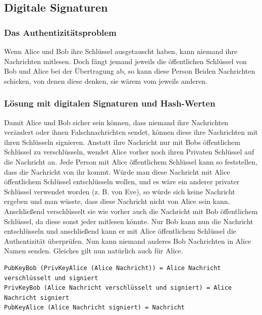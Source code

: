 \clearpage

\subsection{Digitale Signaturen}

\subsubsection{Das Authentizitätsproblem}

Wenn Alice und Bob ihre Schlüssel ausgetauscht haben, kann niemand ihre Nachrichten mitlesen.
Doch fängt jemand jeweils die öffentlichen Schlüssel von Bob und Alice bei der Übertragung ab,
so kann diese Person Beiden Nachrichten schicken, von denen diese denken, sie wärem vom
jeweils anderen.

\subsubsection{Lösung mit digitalen Signaturen und Hash-Werten}

Damit Alice und Bob sicher sein können, dass niemand ihre Nachrichten verändert oder
ihnen Falschnachrichten sendet, können diese ihre Nachrichten mit ihren Schlüsseln signieren.
Anstatt ihre Nachricht nur mit Bobs öffentlichem Schlüssel zu verschlüsseln, wendet Alice vorher noch
ihren Privaten Schlüssel auf die Nachricht an. Jede Person mit Alice öffentlichem Schlüssel
kann so feststellen, dass die Nachricht von ihr kommt. Würde man diese Nachricht mit Alice
öffentlichem Schlüssel entschlüsseln wollen, und es wäre ein anderer privater Schlüssel
verwendet worden (z. B. von Eve), so würde sich keine Nachricht ergeben und man wüsste,
dass diese Nachricht nicht von Alice sein kann. Anschließend verschlüsselt sie wie vorher
auch die Nachricht mit Bob öffentlichem Schlüssel, da diese sonst jeder mitlesen könnte.
Nur Bob kann nun die Nachricht entschlüsseln und anschließend kann er mit Alice öffentlichem
Schlüssel die Authentizität überprüfen. Nun kann niemand anderes Bob Nachrichten in Alice Namen
senden. Gleiches gilt nun natürlich auch für Alice.

\begin{lstlisting}[basicstyle=\small]
PubKeyBob (PrivKeyAlice (Alice Nachricht)) = Alice Nachricht verschlüsselt und signiert
PrivKeyBob (Alice Nachricht verschlüsselt und signiert) = Alice Nachricht signiert
PubKeyAlice (Alice Nachricht signiert) = Nachricht
\end{lstlisting}

